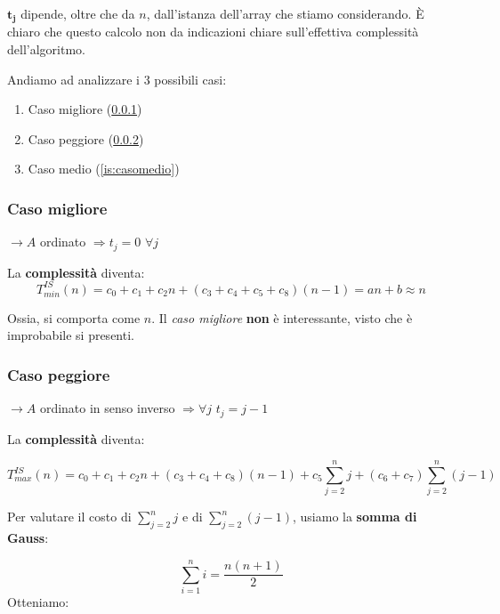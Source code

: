 $\boldsymbol{t_j}$ dipende, oltre che da $n$, dall'istanza dell'array
che stiamo considerando.
È chiaro che questo calcolo non da indicazioni chiare sull'effettiva
complessità dell'algoritmo.\par

\bigskip
Andiamo ad analizzare i 3 possibili casi:

\begin{enumerate}[label=\emph{\alph*})]
    \item Caso migliore (\ref{is:casomigliore})
    \item Caso peggiore (\ref{is:casopeggiore})
    \item Caso medio (\ref{is:casomedio})
\end{enumerate}

\subsubsection{Caso migliore} \label{is:casomigliore}

$\rightarrow A$ ordinato $\Rightarrow t_j = 0 $ $\forall j$

\bigskip
La \textbf{complessità} diventa:
\begin{displaymath}
    T^{IS}_{min}(n) = c_0 + c_1 + c_2n + (c_3+c_4+c_5+c_8)(n-1) 
    = an+b \approx n
\end{displaymath}

Ossia, si comporta come $n$. Il \emph{caso migliore} \textbf{non}
è interessante, visto che è improbabile si presenti.

\subsubsection{Caso peggiore} \label{is:casopeggiore}

$\rightarrow A$ ordinato in senso inverso $\Rightarrow \forall j$ $t_j = j-1$ \par
\bigskip
La \textbf{complessità} diventa: 

\begin{displaymath}
    T^{IS}_{max}(n) = c_0 + c_1 + c_2n + (c_3+c_4+c_8)(n-1)
    + c_5\displaystyle\sum_{j=2}^{n}j + (c_6+c_7)
    \displaystyle\sum_{j=2}^{n}(j-1)
\end{displaymath}

Per valutare il costo di $\displaystyle\sum_{j=2}^{n}j$ e di 
$\displaystyle\sum_{j=2}^{n}(j-1)$, usiamo la \textbf{somma di Gauss}: \par

\begin{equation}
    \displaystyle\sum_{i=1}^{n}i = \frac{n(n+1)}{2}
\end{equation}
\newpage
Otteniamo:

